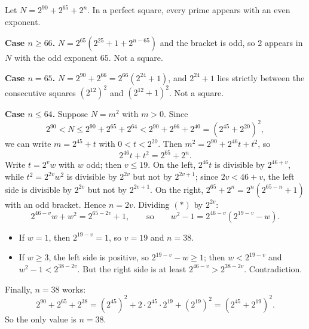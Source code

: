 Let $N=2^{90}+2^{65}+2^n$. In a perfect square, every prime appears with an even exponent.

\textbf{Case $n\ge66$.} $N=2^{65}\left(2^{25}+1+2^{n-65}\right)$ and the bracket is odd, so $2$ appears in $N$ with the odd exponent $65$. Not a square.

\textbf{Case $n=65$.} $N=2^{90}+2^{66}=2^{66}\left(2^{24}+1\right)$, and $2^{24}+1$ lies strictly between the consecutive squares $\left(2^{12}\right)^2$ and $\left(2^{12}+1\right)^2$. Not a square.

\textbf{Case $n\le64$.} Suppose $N=m^2$ with $m>0$. Since
\[2^{90}<N\le2^{90}+2^{65}+2^{64}<2^{90}+2^{66}+2^{40}=\left(2^{45}+2^{20}\right)^2,\]
we can write $m=2^{45}+t$ with $0<t<2^{20}$. Then $m^2=2^{90}+2^{46}t+t^2$, so
\[2^{46}t+t^2=2^{65}+2^n.\tag{$*$}\]
Write $t=2^vw$ with $w$ odd; then $v\le19$. On the left, $2^{46}t$ is divisible by $2^{46+v}$, while $t^2=2^{2v}w^2$ is divisible by $2^{2v}$ but not by $2^{2v+1}$; since $2v<46+v$, the left side is divisible by $2^{2v}$ but not by $2^{2v+1}$. On the right, $2^{65}+2^n=2^n\left(2^{65-n}+1\right)$ with an odd bracket. Hence $n=2v$. Dividing $(*)$ by $2^{2v}$:
\[2^{46-v}w+w^2=2^{65-2v}+1,\qquad\text{so}\qquad w^2-1=2^{46-v}\left(2^{19-v}-w\right).\]
\begin{itemize}
\item If $w=1$, then $2^{19-v}=1$, so $v=19$ and $n=38$.
\item If $w\ge3$, the left side is positive, so $2^{19-v}-w\ge1$; then $w<2^{19-v}$ and $w^2-1<2^{38-2v}$. But the right side is at least $2^{46-v}>2^{38-2v}$. Contradiction.
\end{itemize}
Finally, $n=38$ works:
\[2^{90}+2^{65}+2^{38}=\left(2^{45}\right)^2+2\cdot2^{45}\cdot2^{19}+\left(2^{19}\right)^2=\left(2^{45}+2^{19}\right)^2.\]
So the only value is $\boxed{n=38}$.
